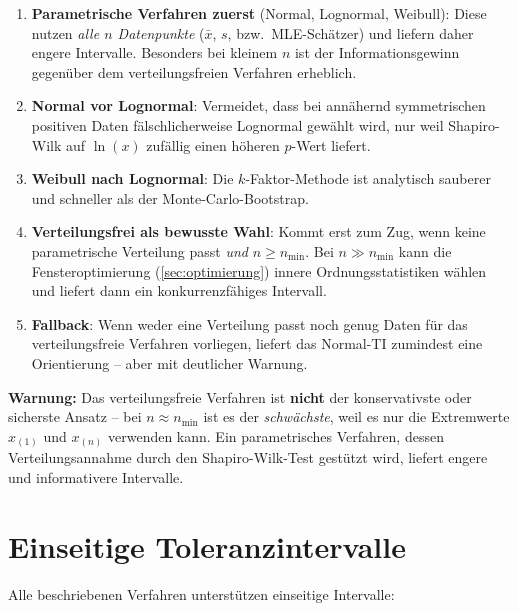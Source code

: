 \documentclass[10pt,a4paper,twocolumn]{article}
\theoremstyle{definition}
\newcommand{\warnung}[1]{%
    \begin{center}
    \colorbox{warnred}{\parbox{0.92\linewidth}{\small\textbf{Warnung:} #1}}
    \end{center}
}
\newcommand{\xbar}{\bar{x}}
\begin{document}
\begin{enumerate}[nosep,leftmargin=*]
    \item \textbf{Parametrische Verfahren zuerst} (Normal, Lognormal,
          Weibull): Diese nutzen \emph{alle $n$ Datenpunkte}
          ($\xbar$, $s$, bzw.\ MLE-Schätzer) und liefern daher
          engere Intervalle. Besonders bei kleinem $n$ ist der
          Informationsgewinn gegenüber dem verteilungsfreien Verfahren
          erheblich.
    \item \textbf{Normal vor Lognormal}: Vermeidet, dass bei
          annähernd symmetrischen positiven Daten fälschlicherweise
          Lognormal gewählt wird, nur weil Shapiro-Wilk auf
          $\ln(x)$ zufällig einen höheren $p$-Wert liefert.
    \item \textbf{Weibull nach Lognormal}: Die $k$-Faktor-Methode
          ist analytisch sauberer und schneller als der
          Monte-Carlo-Bootstrap.
    \item \textbf{Verteilungsfrei als bewusste Wahl}: Kommt erst
          zum Zug, wenn keine parametrische Verteilung passt
          \emph{und} $n \geq n_{\min}$. Bei $n \gg n_{\min}$
          kann die Fensteroptimierung (\cref{sec:optimierung}) innere
          Ordnungsstatistiken wählen und liefert dann ein
          konkurrenzfähiges Intervall.
    \item \textbf{Fallback}: Wenn weder eine Verteilung passt noch
          genug Daten für das verteilungsfreie Verfahren vorliegen,
          liefert das Normal-TI zumindest eine Orientierung --
          aber mit deutlicher Warnung.
\end{enumerate}

\warnung{Das verteilungsfreie Verfahren ist \textbf{nicht} der
konservativste oder sicherste Ansatz -- bei $n \approx n_{\min}$
ist es der \emph{schwächste}, weil es nur die Extremwerte
$x_{(1)}$ und $x_{(n)}$ verwenden kann. Ein parametrisches
Verfahren, dessen Verteilungsannahme durch den Shapiro-Wilk-Test
gestützt wird, liefert engere und informativere Intervalle.}


\section{Einseitige Toleranzintervalle}
\label{sec:einseitig}

Alle beschriebenen Verfahren unterstützen einseitige Intervalle:
\end{document}
